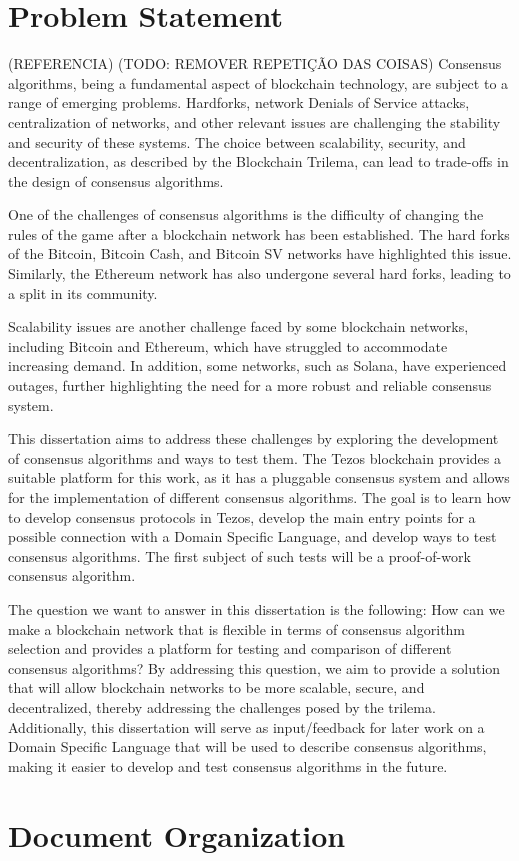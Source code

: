\section{Problem Statement}
(REFERENCIA)
(TODO: REMOVER REPETIÇÃO DAS COISAS)
Consensus algorithms, being a fundamental aspect of blockchain technology, are subject to a range of emerging problems. Hardforks, network Denials of Service attacks, centralization of networks, and other relevant issues are challenging the stability and security of these systems. The choice between scalability, security, and decentralization, as described by the Blockchain Trilema, can lead to trade-offs in the design of consensus algorithms.

One of the challenges of consensus algorithms is the difficulty of changing the rules of the game after a blockchain network has been established. The hard forks of the Bitcoin, Bitcoin Cash, and Bitcoin SV networks have highlighted this issue. Similarly, the Ethereum network has also undergone several hard forks, leading to a split in its community.

Scalability issues are another challenge faced by some blockchain networks, including Bitcoin and Ethereum, which have struggled to accommodate increasing demand. In addition, some networks, such as Solana, have experienced outages, further highlighting the need for a more robust and reliable consensus system.

This dissertation aims to address these challenges by exploring the development of consensus algorithms and ways to test them. The Tezos blockchain provides a suitable platform for this work, as it has a pluggable consensus system and allows for the implementation of different consensus algorithms. The goal is to learn how to develop consensus protocols in Tezos, develop the main entry points for a possible connection with a Domain Specific Language, and develop ways to test consensus algorithms. 
The first subject of such tests will be a proof-of-work consensus algorithm.

The question we want to answer in this dissertation is the following: How can we make a blockchain network that is flexible in terms of consensus algorithm selection and provides a platform for testing and comparison of different consensus algorithms? By addressing this question, we aim to provide a solution that will allow blockchain networks to be more scalable, secure, and decentralized, thereby addressing the challenges posed by the trilema. Additionally, this dissertation will serve as input/feedback for later work on a Domain Specific Language that will be used to describe consensus algorithms, making it easier to develop and test consensus algorithms in the future.

\section{Document Organization}
